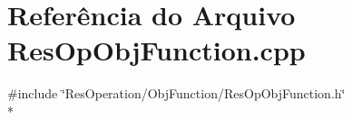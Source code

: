 \section{Referência do Arquivo Res\+Op\+Obj\+Function.\+cpp}
\label{_obj_function_2_res_op_obj_function_8cpp}
{\ttfamily \#include \char`\"{}Res\+Operation/\+Obj\+Function/\+Res\+Op\+Obj\+Function.\+h\char`\"{}}\\*
